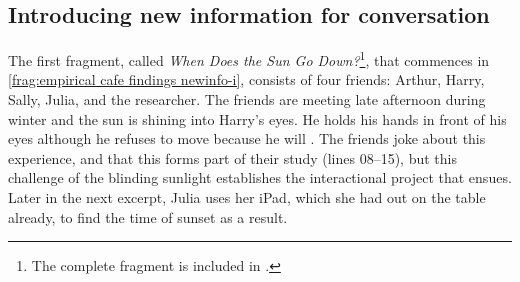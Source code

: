 \subsection{Introducing new information for conversation}\label{sec:empirical cafe findings newinfo}
\begin{revisedsubmission}
The first fragment, called \textit{When Does the Sun Go Down?}\footnote{The complete fragment is included in .}, that commences in \autoref{frag:empirical cafe findings newinfo-i}, consists of four friends: Arthur, Harry, Sally, Julia, and the researcher.
The friends are meeting late afternoon during winter and the sun is shining into Harry's eyes.
He holds his hands in front of his eyes although he refuses to move because he will .
The friends joke about this experience, and that this forms part of their study (lines 08–15), but this challenge of the blinding sunlight establishes the interactional project that ensues.
Later in the next excerpt, Julia uses her iPad, which she had out on the table already, to find the time of sunset as a result.


\end{revisedsubmission}
